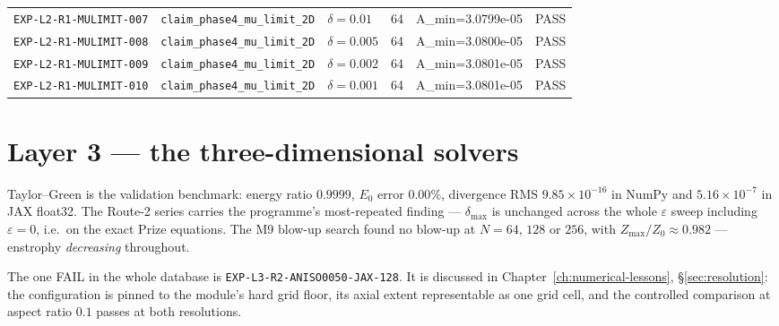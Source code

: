 {\begin{longtable}{@{}>{\raggedright\arraybackslash}p{} >{\raggedright\arraybackslash}p{} l l >{\raggedright\arraybackslash}p{} l@{}}
\texttt{EXP-\allowbreak{}L2-\allowbreak{}R1-\allowbreak{}MULIMIT-\allowbreak{}007} & \texttt{claim\_\allowbreak{}phase4\_\allowbreak{}mu\_\allowbreak{}limit\_\allowbreak{}2D} & $\delta=\allowbreak{}0.01$ & 64 & A\_\allowbreak{}min=\allowbreak{}3.0799e-05 & \textsf{PASS}\\
\texttt{EXP-\allowbreak{}L2-\allowbreak{}R1-\allowbreak{}MULIMIT-\allowbreak{}008} & \texttt{claim\_\allowbreak{}phase4\_\allowbreak{}mu\_\allowbreak{}limit\_\allowbreak{}2D} & $\delta=\allowbreak{}0.005$ & 64 & A\_\allowbreak{}min=\allowbreak{}3.0800e-05 & \textsf{PASS}\\
\texttt{EXP-\allowbreak{}L2-\allowbreak{}R1-\allowbreak{}MULIMIT-\allowbreak{}009} & \texttt{claim\_\allowbreak{}phase4\_\allowbreak{}mu\_\allowbreak{}limit\_\allowbreak{}2D} & $\delta=\allowbreak{}0.002$ & 64 & A\_\allowbreak{}min=\allowbreak{}3.0801e-05 & \textsf{PASS}\\
\texttt{EXP-\allowbreak{}L2-\allowbreak{}R1-\allowbreak{}MULIMIT-\allowbreak{}010} & \texttt{claim\_\allowbreak{}phase4\_\allowbreak{}mu\_\allowbreak{}limit\_\allowbreak{}2D} & $\delta=\allowbreak{}0.001$ & 64 & A\_\allowbreak{}min=\allowbreak{}3.0801e-05 & \textsf{PASS}\\
\end{longtable}}

\section{Layer 3 --- the three-dimensional solvers}
\label{sec:a1-l3}

Taylor--Green is the validation benchmark: energy ratio \(0.9999\),
\(E_0\) error \(0.00\%\), divergence RMS \(9.85\times10^{-16}\) in NumPy and
\(5.16\times10^{-7}\) in JAX float32. The Route-2 series carries the
programme's most-repeated finding --- \(\delta_{\max}\) is unchanged across
the whole \(\varepsilon\) sweep including \(\varepsilon=0\), i.e.\ on the exact
Prize equations. The M9 blow-up search found no blow-up at \(N=64\), \(128\)
or \(256\), with \(Z_{\max}/Z_0\approx0.982\) --- enstrophy \emph{decreasing}
throughout.

The one \textsf{FAIL} in the whole database is
\texttt{EXP-\allowbreak{}L3-\allowbreak{}R2-\allowbreak{}ANISO0050-\allowbreak{}JAX-\allowbreak{}128}. It is discussed in
Chapter~\ref{ch:numerical-lessons}, \S\ref{sec:resolution}: the configuration
is pinned to the module's hard grid floor, its axial extent representable as
one grid cell, and the controlled comparison at aspect ratio \(0.1\) passes at
both resolutions.

